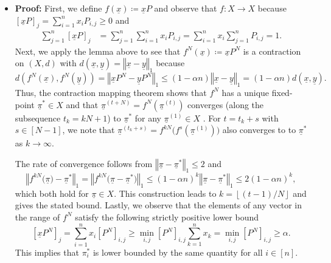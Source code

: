 \documentclass[11pt,twoside]{report}
\newcommand{\vecnot}{\underline}
\begin{document}
\begin{itemize}
\item \textbf{Proof:} 
First, we define $f(\vecnot x)\coloneqq\vecnot xP$ and observe that $f\colon X\to X$ because $\left[\vecnot xP\right]_{j}=\sum_{i=1}^{n}x_{i}P_{i,j}\geq0$ and 
\begin{align*}
\sum_{j=1}^{n}\left[\vecnot xP\right]_{j} & =\sum_{j=1}^{n}\sum_{i=1}^{n}x_{i}P_{i,j}=\sum_{i=1}^{n}x_{i}\sum_{j=1}^{n}P_{i,j}=1.
\end{align*}
Next, we apply the lemma above to see that $f^{N}(\vecnot x)\coloneqq\vecnot xP^{N}$ is a contraction on $(X,d)$ with $d\left(\vecnot x,\vecnot y\right)=\left\Vert \vecnot x-\vecnot y\right\Vert _{1}$ because
\[
d\left(f^{N}(\vecnot x),f^{N}(\vecnot y)\right)=\left\Vert \vecnot xP^{N}-\vecnot yP^{N}\right\Vert _{1}\leq(1-\alpha n)\left\Vert \vecnot x-\vecnot y\right\Vert _{1}=(1-\alpha n)d\left(\vecnot x,\vecnot y\right).
\]
Thus, the contraction mapping theorem shows that $f^{N}$ has a unique fixed-point $\vecnot{\pi}^{*}\in X$ and that $\vecnot{\pi}^{(t+N)}=f^{N}(\vecnot{\pi}^{(t)})$ converges (along the subsequence $t_{k}=kN+1$) to $\vecnot{\pi}^{*}$ for any $\vecnot{\pi}^{(1)}\in X$ . For $t=t_{k}+s$ with $s\in[N-1]$, we note that $\vecnot{\pi}^{(t_{k}+s)}=f^{kN}\big(f^{s}(\vecnot{\pi}^{(1)}))$ also converges to to $\vecnot{\pi}^{*}$ as $k\to\infty$. 

The rate of convergence follows from $\left\Vert \vecnot{\pi}-\vecnot{\pi}^{*}\right\Vert _{1}\leq2$ and 
\[
\left\Vert f^{kN}\big(\vecnot{\pi}\big)-\vecnot{\pi}^{*}\right\Vert _{1}=\left\Vert f^{kN}\big(\vecnot{\pi}-\vecnot{\pi}^{*}\big)\right\Vert _{1}\leq(1-\alpha n)^{k}\left\Vert \vecnot{\pi}-\vecnot{\pi}^{*}\right\Vert _{1}\leq2(1-\alpha n)^{k},
\]
which both hold for $\vecnot{\pi}\in X$. This construction leads to $k=\left\lfloor (t-1)/N\right\rfloor $ and gives the stated bound. Lastly, we observe that the elements of any vector in the range of $f^{N}$ satisfy the following strictly positive lower bound 
\[
\left[\vecnot xP^{N}\right]_{j}=\sum_{i=1}^{n}x_{i}\left[P^{N}\right]_{i,j}\geq\min_{i,j}\left[P^{N}\right]_{i,j}\sum_{k=1}^{n}x_{k}=\min_{i,j}\left[P^{N}\right]_{i,j}\geq\alpha.
\]
This implies that $\pi_{i}^{*}$ is lower bounded by the same quantity for all $i\in[n]$.







\end{itemize}
\end{document}
